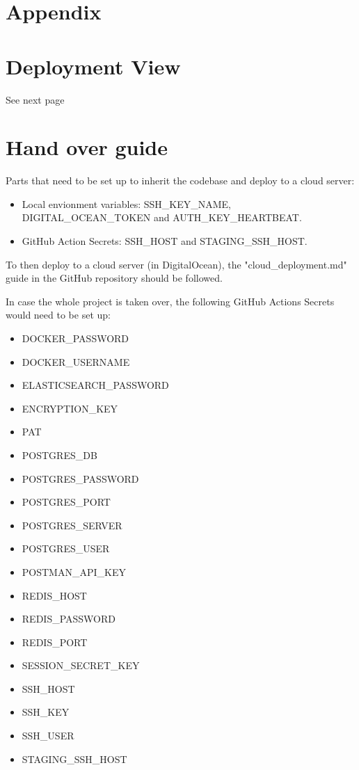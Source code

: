 \pagebreak
\printbibliography


\pagebreak
\section{Appendix}
\appendix


\section{Deployment View}
See next page
\label{appendix:DeploymentView}


\section{Hand over guide}
\label{appendix:handOverGuide}
Parts that need to be set up to inherit the codebase and deploy to a cloud server:
\begin{itemize}
    \item Local envionment variables: SSH\_KEY\_NAME, DIGITAL\_OCEAN\_TOKEN and AUTH\_KEY\_HEARTBEAT.
    \item GitHub Action Secrets: SSH\_HOST and STAGING\_SSH\_HOST.
\end{itemize}
To then deploy to a cloud server (in DigitalOcean), the "cloud\_deployment.md" guide in the GitHub repository should be followed.

In case the whole project is taken over, the following GitHub Actions Secrets would need to be set up:
\begin{itemize}
    \item DOCKER\_PASSWORD
    \item DOCKER\_USERNAME
    \item ELASTICSEARCH\_PASSWORD
    \item ENCRYPTION\_KEY
    \item PAT
    \item POSTGRES\_DB
    \item POSTGRES\_PASSWORD
    \item POSTGRES\_PORT
    \item POSTGRES\_SERVER
    \item POSTGRES\_USER
    \item POSTMAN\_API\_KEY
    \item REDIS\_HOST
    \item REDIS\_PASSWORD
    \item REDIS\_PORT
    \item SESSION\_SECRET\_KEY
    \item SSH\_HOST
    \item SSH\_KEY
    \item SSH\_USER
    \item STAGING\_SSH\_HOST
\end{itemize}

